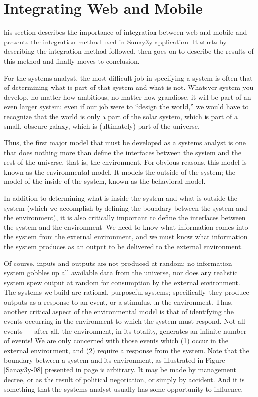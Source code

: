 \documentclass[12pt,a4paper,final,twoside,onecolumn,titlepage]{book}
\begin{document}
\section{Integrating Web and Mobile}
his section describes the importance of integration between web and mobile and presents the integration method used in Sanay3y application. It starts by describing the integration method followed, then goes on to describe the results of this method and finally moves to conclusion.

For the systems analyst, the most difficult job in specifying a system is often that of determining what is part of that system and what is not. Whatever system you develop, no matter how ambitious, no matter how grandiose, it will be part of an even larger system: even if our job were to “design the world,” we would have to recognize that the world is only a part of the solar system, which is part of a small, obscure galaxy, which is (ultimately) part of the universe.

Thus, the first major model that must be developed as a systems analyst is one that does nothing more than define the interfaces between the system and the rest of the universe, that is, the environment. For obvious reasons, this model is known as the environmental model. It models the outside of the system; the model of the inside of the system, known as the behavioral model.

In addition to determining what is inside the system and what is outside the system (which we accomplish by defining the boundary between the system and the environment), it is also critically important to define the interfaces between the system and the environment. We need to know what information comes into the system from the external environment, and we must know what information the system produces as an output to be delivered to the external environment.

Of course, inputs and outputs are not produced at random: no information system gobbles up all available data from the universe, nor does any realistic system spew output at random for consumption by the external environment. The systems we build are rational, purposeful systems; specifically, they produce outputs as a response to an event, or a stimulus, in the environment. Thus, another critical aspect of the environmental model is that of identifying the events occurring in the environment to which the system must respond. Not all events — after all, the environment, in its totality, generates an infinite number of events! We are only concerned with those events which (1) occur in the external environment, and (2) require a response from the system.
Note that the boundary between a system and its environment, as illustrated in Figure \ref{Sanay3y-08} presented in page \pageref{Sanay3y-08} is arbitrary. It may be made by management decree, or as the result of political negotiation, or simply by accident. And it is something that the systems analyst usually has some opportunity to influence.
	
\end{document}
